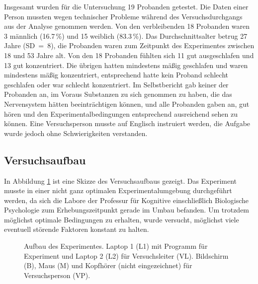 \documentclass[doc,a4paper,12pt]{apa6}
\begin{document}
Insgesamt wurden für die Untersuchung 19 Probanden getestet. Die Daten einer Person mussten wegen technischer Probleme während des Versuchsdurchgangs aus der Analyse genommen werden. Von den verbleibenden 18 Probanden waren 3 männlich (16.7\,\%) und 15 weiblich (83.3\,\%). Das Durchschnittsalter betrug 27 Jahre (SD~=~8), die Probanden waren zum Zeitpunkt des Experimentes zwischen 18 und 53 Jahre alt. Von den 18 Probanden fühlten sich 11 gut ausgeschlafen und 13 gut konzentriert. Die übrigen hatten mindestens mäßig geschlafen und waren mindestens mäßig konzentriert, entsprechend hatte kein Proband schlecht geschlafen oder war schlecht konzentriert. Im Selbstbericht gab keiner der Probanden an, im Voraus Substanzen zu sich genommen zu haben, die das Nervensystem hätten beeinträchtigen können, und alle Probanden gaben an, gut hören und den Experimentalbedingungen entsprechend ausreichend sehen zu können. Eine Versuchsperson musste auf Englisch instruiert werden, die Aufgabe wurde jedoch ohne Schwierigkeiten verstanden.

\subsection{Versuchsaufbau}

In Abbildung \ref{experiment} ist eine Skizze des Versuchsaufbaus gezeigt. Das Experiment musste in einer nicht ganz optimalen Experimentalumgebung durchgeführt werden, da sich die Labore der Professur für Kognitive einschließlich Biologische Psychologie zum Erhebungszeitpunkt gerade im Umbau befanden. Um trotzdem möglichst optimale Bedingungen zu erhalten, wurde versucht, möglichst viele eventuell störende Faktoren konstant zu halten.

\begin{figure}
  \centering
  \begin{minipage}{.55\textwidth}
    \setlength{\fboxsep}{.05\textwidth}
    \vspace{10pt}
    \caption[Aufbau des Experimentes]{Aufbau des Experimentes. Laptop 1 (L1) mit Programm für Experiment und Laptop 2 (L2) für Versuchsleiter (VL). Bildschirm (B), Maus (M) und Kopfhörer (nicht eingezeichnet) für Versuchsperson (VP).}
    \label{experiment}
  \end{minipage}
\end{figure}
\end{document}
